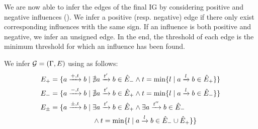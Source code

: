 We are now able to infer the edges of the final IG by considering positive and negative influences
().
We infer a positive (resp. negative) edge if there only exist corresponding influences with the same sign.
If an influence is both positive and negative, we infer an unsigned edge.
In the end, the threshold of each edge is the minimum threshold for which an influence has been found.
%
\begin{proposition}\label{pps:inference-IG}
We infer $\mathcal{G} = (\Gamma,E)$ using  as follows:
\begin{align*}
E_+ &= \{ a \xrightarrow{+, t} b \mid \nexists a \xrightarrow{t'} b \in \hat{E}_-
  \wedge t = \min \{ l \mid a \xrightarrow{l} b \in \hat{E}_+\}\} \\
E_- &= \{ a \xrightarrow{-, t} b \mid \nexists a \xrightarrow{t'} b \in \hat{E}_+
  \wedge t = \min \{l \mid a \xrightarrow{l} b \in \hat{E}_-\}\} \\
E_\pm &= \{ a \xrightarrow{\pm, t} b \mid \exists a \xrightarrow{t'} b \in \hat{E}_+ \wedge \exists a \xrightarrow{t''} b \in \hat{E}_- \\
  & \qquad\qquad\qquad \wedge t = \min \{l \mid a \xrightarrow{l} b \in \hat{E}_- \cup \hat{E}_+\}\}
\end{align*}
\end{proposition}



